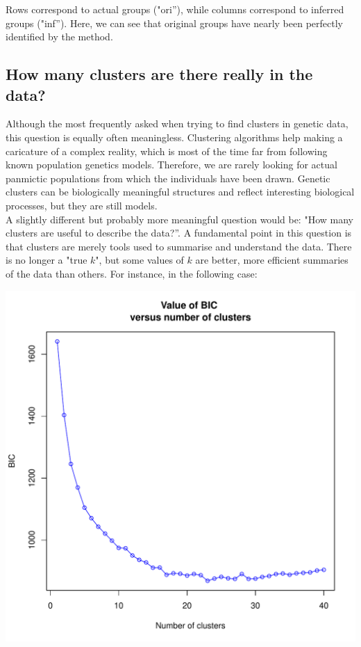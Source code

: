 \documentclass{article}
\begin{document}
\noindent
Rows correspond to actual groups ("ori''), while columns correspond to inferred groups ("inf'').
Here, we can see that original groups have nearly been perfectly identified by the method.


\subsection{How many clusters are there really in the data?}

Although the most frequently asked when trying to find clusters in genetic data, this question is
equally often meaningless. Clustering algorithms help making a caricature of a complex reality,
which is most of the time far from following known population genetics models. Therefore, we are
rarely looking for actual panmictic populations from which the individuals have been drawn. Genetic
clusters can be biologically meaningful structures and reflect interesting biological processes, but
they are still models.
\\

A slightly different but probably more meaningful question would be: "How many clusters are useful to
describe the data?''. A fundamental point in this question is that clusters are merely tools used to
summarise and understand the data. There is no longer a "true $k$", but some values of $k$ are
better, more efficient summaries of the data than others.
For instance, in the following case:
\begin{center}
  \includegraphics[width=.7\textwidth]{findclust-noclearcut.pdf}
\end{center}
\end{document}
